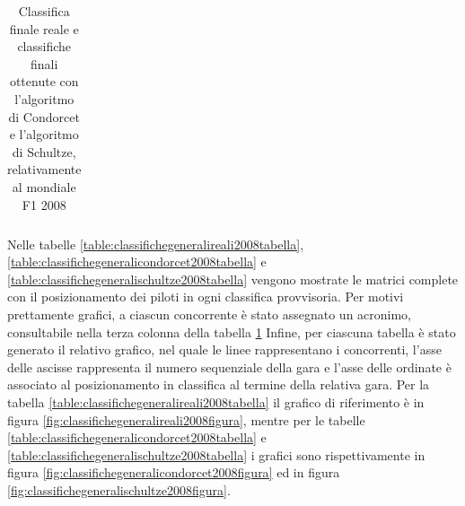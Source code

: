 \documentclass[12pt,a4paper,openright,twoside]{book}
\begin{document}
\begin{table}[H]
{\begin{tabular}{|p{0.1\linewidth}|p{0.33\linewidth}|p{0.33\linewidth}|p{0.33\linewidth}|}
    \end{tabular}}
    \endgroup
    \caption{Classifica finale reale e classifiche finali ottenute con 
    l'algoritmo di Condorcet e l'algoritmo di Schultze, relativamente al mondiale F1 2008 }
    \label{table:classifichefinali2008}
\end{table}
Nelle tabelle \ref{table:classifichegeneralireali2008tabella}, \ref{table:classifichegeneralicondorcet2008tabella} e \ref{table:classifichegeneralischultze2008tabella}
vengono mostrate le matrici complete con il posizionamento dei piloti in ogni classifica provvisoria.
Per motivi prettamente grafici, a ciascun concorrente è stato assegnato un acronimo, consultabile nella terza colonna della tabella \ref{table:classifichefinali2008}
Infine, per ciascuna tabella è stato generato il relativo grafico, nel quale le linee rappresentano i concorrenti,
l'asse delle ascisse rappresenta il numero sequenziale della gara e l'asse delle ordinate è associato al posizionamento in classifica
al termine della relativa gara.
Per la tabella \ref{table:classifichegeneralireali2008tabella} il grafico di riferimento è in figura \ref{fig:classifichegeneralireali2008figura},
mentre per le tabelle \ref{table:classifichegeneralicondorcet2008tabella} e \ref{table:classifichegeneralischultze2008tabella} i grafici sono rispettivamente
in figura \ref{fig:classifichegeneralicondorcet2008figura} ed in figura \ref{fig:classifichegeneralischultze2008figura}.
\end{document}
